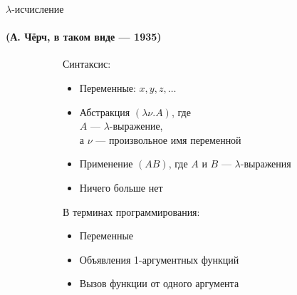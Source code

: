 \begin{frame}{$\lambda$-исчисление}
\framesubtitle{(А. Чёрч, в таком виде --- 1935)}
\begin{figure}[t]
  \begin{subfigure}[t]{0.5\textwidth}
    \vspace{-5em}
    \vspace{-1em}
    Синтаксис:
    \begin{itemize}
      \item Переменные: $x,y,z,\dots$
      \item Абстракция $(\lambda \nu. A)$, где \\
      $A$ --- $\lambda$-выражение, \\
      а $\nu$ --- произвольное имя переменной
      \item Применение $(AB)$, где $A$ и $B$ --- $\lambda$-выражения
      \item Ничего больше нет
    \end{itemize}
  \end{subfigure}
\hspace{1cm}
  \begin{subfigure}[t]{0.4 \textwidth}

      \vspace{-5.5em}
В терминах программирования:
\begin{itemize}
  \item Переменные
  \item Объявления 1-аргументных функций
  \item Вызов функции от одного аргумента
\end{itemize}
\end{subfigure}
\end{figure}
\end{frame}


